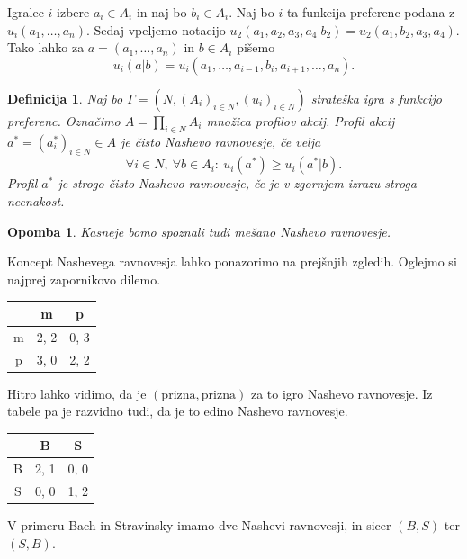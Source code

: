 \documentclass[10pt, a4paper]{article}
\newtheorem{defi}[izr]{Definicija}
\newenvironment{noticeB}{%
  \tcolorbox[%
  notitle,
  empty,
  enhanced,  %
  breakable,
  coltext=black,
  colback=white, 
  fontupper=\rmfamily,
  noparskip,
  sharp corners,
  boxrule=-1pt,  %
  frame hidden,
  left=7pt,  %
  right=7pt,
  top=5pt,
  bottom=5pt,
  before skip=2.5ex plus 2pt,
  after skip=2.5ex plus 2pt,
  borderline west = {1.5pt}{-0.1pt}{blue!30!black}, %
  overlay unbroken and last={%
    \draw[color=black, line width=1.25pt]
    ($(frame.south west)+(1.pt, -0.1pt)$) -- ++(2em, 0);
  }
  ]}
{\endtcolorbox}
\newenvironment{definicija}{\begin{noticeB}\begin{defi}}{%
    \end{defi}\end{noticeB}}
\newtheorem*{opomba}{Opomba}
\begin{document}
Igralec $i$ izbere $a_i \in A_i$ in naj bo $b_i \in A_i$. Naj bo $i$-ta funkcija preferenc podana z $u_i (a_1, \dots, a_n)$.
Sedaj vpeljemo notacijo $u_2 (a_1, a_2, a_3, a_4 | b_2) = u_2 (a_1, b_2, a_3, a_4)$.
Tako lahko za $a = (a_1, \dots, a_n)$ in $b \in A_i$ pišemo $$u_i (a | b) = u_i (a_1, \dots, a_{i - 1}, b_i, a_{i + 1}, \dots, a_n).$$

\begin{definicija}
    Naj bo $\Gamma = (N, (A_i)_{i \in N}, (u_i)_{i \in N})$
    strateška igra s funkcijo preferenc. Označimo $A = \prod_{i \in N}A_i$
    množica profilov akcij. Profil akcij $a^* = (a_i ^*)_{i \in N} \in A$
    je čisto Nashevo ravnovesje, če velja 
    $$\forall i \in N,\ \forall b \in A_i:\ u_i (a^*) \geq u_i (a^* | b).$$
    Profil $a^*$ je strogo čisto Nashevo ravnovesje, če je v zgornjem izrazu stroga neenakost.
\end{definicija}

\begin{opomba}
    Kasneje bomo spoznali tudi mešano Nashevo ravnovesje.
\end{opomba}

Koncept Nashevega ravnovesja lahko ponazorimo na prejšnjih zgledih.
Oglejmo si najprej zapornikovo dilemo.

\begin{center}
    {\begin{tabular}{c|c|c|}
        & m & p\\
        \hline
        m & 2, 2 & 0, 3\\
        \hline
        p & 3, 0 & 2, 2\\
        \hline
    \end{tabular}}        
\end{center}

Hitro lahko vidimo, da je $(\mathrm{prizna}, \mathrm{prizna})$ za to igro Nashevo ravnovesje.
Iz tabele pa je razvidno tudi, da je to edino Nashevo ravnovesje.

\begin{center}
    {\begin{tabular}{c|c|c|}
        & B & S\\
        \hline
        B & 2, 1 & 0, 0\\
        \hline
        S & 0, 0 & 1, 2\\
        \hline
    \end{tabular}}        
\end{center}

V primeru Bach in Stravinsky imamo dve Nashevi ravnovesji, in sicer $(B, S)$ ter $(S, B)$.
\end{document}
